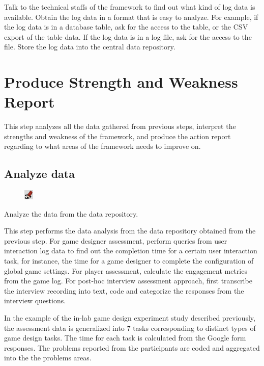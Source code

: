 \documentclass[11pt,oneside]{book}
\begin{document}
Talk to the technical staffs of the framework to find out what kind of log data is available. Obtain the log data in a format that 
is easy to analyze. For example, if the log data is in a database table, ask for the access to the table, or the CSV export of 
the table data. If the log data is in a log file, ask for the access to the file. Store the log data into the central data repository.

\chapter{Produce Strength and Weakness Report}

This step analyzes all the data gathered from previous steps, interpret the strengths and weakness of the framework, 
and produce the action report regarding to what areas of the framework needs to improve on.

\section{Analyze data}
\begin{shadebox}
\begin{figure}
\vspace{-15pt}\hspace{-10pt}
    \includegraphics[width=0.04\textwidth]{note-icon}
\end{figure}
Analyze the data from the data repository.
\end{shadebox}
This step performs the data analysis from the data repository obtained from the previous step. For game designer assessment, 
perform queries from user interaction log data to find out the completion time for a certain user interaction task, for instance, the 
time for a game designer to complete the configuration of global game settings. For player assessment, calculate the 
engagement metrics from the game log. For post-hoc interview assessment approach, first transcribe the interview recording into 
text, code and categorize the responses from the interview questions. 

In the example of the in-lab game design experiment study described previously, the assessment data is generalized into 7 tasks
corresponding to distinct types of game design tasks. The time for each task is calculated from the Google form responses. The 
problems reported from the participants are coded and aggregated into the the problems areas. 
\end{document}
